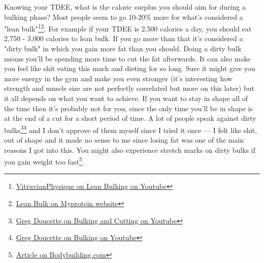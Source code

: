 \documentclass[openany, 12pt]{book}
\begin{document}
	Knowing your TDEE, what is the caloric surplus you should aim for during a bulking phase? Most people seem to go 10-20\% more for what's considered a "lean bulk"\footnote{\href{https://www.youtube.com/watch?v=rCdba0UPTMk}{VitruvianPhysique on Lean Bulking on Youtube}}\footnote{\href{https://us.myprotein.com/thezone/nutrition/the-lean-bulk-how-to-minimize-fat-gain-while-bulking/}{Lean Bulk on Myprotein website}}. For example if your TDEE is 2,500 calories a day, you should eat 2,750 - 3,000 calories to lean bulk. If you go more than that it's considered a "dirty bulk" in which you gain more fat than you should. Doing a dirty bulk means you'll be spending more time to cut the fat afterwards. It can also make you feel like shit eating this much and dieting for so long. Sure it might give you more energy in the gym and make you even stronger (it's interesting how strength and muscle size are not perfectly correlated but more on this later) but it all depends on what you want to achieve. If you want to stay in shape all of the time then it's probably not for you, since the only time you'll be in shape is at the end of a cut for a short period of time. A lot of people speak against dirty bulks\footnote{\href{https://www.youtube.com/watch?v=DjEnkzhz5T4}{Greg Doucette on Bulking and Cutting on Youtube}}\footnote{\href{https://www.youtube.com/watch?v=xl0ZNFcvuJI}{Greg Doucette on Bulking on Youtube}} and I don't approve of them myself since I tried it once --- I felt like shit, out of shape and it made no sense to me since losing fat was one of the main reasons I got into this. You might also experience stretch marks on dirty bulks if you gain weight too fast\footnote{\href{https://www.bodybuilding.com/content/stretchmark-maintenance.html}{Article on Bodybuilding.com}}.
	
\end{document}
